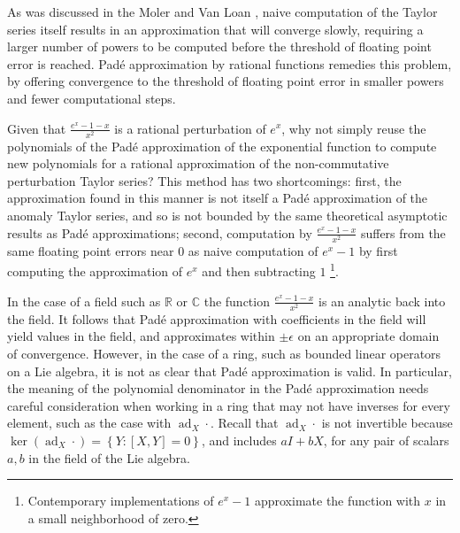 As was discussed in the Moler and Van Loan \cite{moler_nineteen_1978,moler_nineteen_2003}, 
naive computation of the Taylor series itself results in an approximation that will converge 
slowly, requiring a larger number of powers to be computed before the threshold of floating 
point error is reached. Pad\'{e} approximation by rational functions remedies this problem, 
by offering convergence to the threshold of floating point error in smaller powers and 
fewer computational steps.

Given that $\frac{e^{x} -1 - x}{x^2}$ is a rational perturbation of $e^x$, why not simply 
reuse the polynomials of the Pad\'{e} approximation of the exponential function to compute 
new polynomials for a rational approximation of the non-commutative perturbation Taylor 
series? This method has two shortcomings: first, the approximation found in this manner is 
not itself a Pad\'{e} approximation of the anomaly Taylor series, and so is not bounded by 
the same theoretical asymptotic results as Pad\'{e} approximations; second, computation by $\frac{e^{x} - 1 - x}{x^2}$ 
suffers from the same floating point errors near $0$ as naive computation of $e^x - 1$ by 
first computing the approximation of $e^x$ and then subtracting $1$
\footnote{Contemporary implementations of $e^x - 1$ approximate the function with $x$ in a
small neighborhood of zero.}.

In the case of a field such as $\mathbb{R}$ or $\mathbb{C}$ the function $\frac{e^{x} -1 - x}{x^2}$
is an analytic back into the field. It follows that Pad\'{e} approximation with coefficients 
in the field will yield values in the field, and approximates within $\pm\epsilon$ on an 
appropriate domain of convergence. However, in the case of a ring, such as bounded linear 
operators on a Lie algebra, it is not as clear that Pad\'{e} approximation is valid. In 
particular, the meaning of the polynomial denominator in the Pad\'{e} approximation needs 
careful consideration when working in a ring that may not have inverses for every element, 
such as the case with $\operatorname{ad}_X \cdotp$. Recall that $\operatorname{ad}_X \cdotp$ 
is not invertible because $\ker\left(\operatorname{ad}_X \cdotp\right) = \left\lbrace Y : \left[X,Y\right]=0 \right\rbrace$, 
and includes $aI+bX$, for any pair of scalars $a,b$ in the field of the Lie algebra. 

